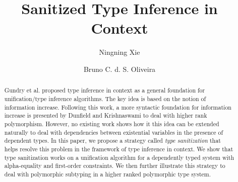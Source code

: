 \documentclass[oribibl]{llncs}
\begin{document}
\title{Sanitized Type Inference in Context}

\author{Ningning Xie \and Bruno C. d. S. Oliveira}

\maketitle

\begin{abstract}
  Gundry et al. proposed type inference in context as a general foundation for
  unification/type inference algorithms. The key idea is based on the notion of
  information increase. Following this work, a more syntactic foundation for
  information increase is presented by Dunfield and Krishnaswami to deal with higher rank polymorphism.
  However, no existing work shows how it this idea can be extended naturally to deal
  with dependencies between existential variables in the presence of dependent types.
  In this paper, we propose a strategy called \textit{type
    sanitization} that helps resolve this problem
  in the framework of type inference in context. We show
  that type sanitization works on a unification algorithm for a dependently typed
  system with alpha-equality and first-order constraints. We then further illustrate
  this strategy to deal with polymorphic subtyping in a higher ranked
  polymorphic type system.
\end{abstract}












% 



\appendix

% 
\end{document}
